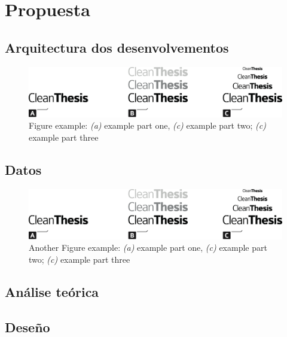 %
\chapter{Propuesta}
\label{sec:system}



{
\color{gray}
\Blindtext[2][1]
}

\section{Arquitectura dos desenvolvementos}
\label{sec:system:sec1}
{
\color{gray}
\Blindtext[1][2]
}

\begin{figure}[htb]
	\includegraphics[width=\textwidth]{images/Clean-Thesis-Figure}
	\caption{Figure example: \textit{(a)} example part one, \textit{(c)} example part two; \textit{(c)} example part three}
	\label{fig:system:example1}
\end{figure}

{
\color{gray}
\Blindtext[1][2]
}

\section{Datos}
\label{sec:system:sec2}

{
\color{gray}
\Blindtext[1][2]
}

\begin{figure}[htb]
	\includegraphics[width=\textwidth]{images/Clean-Thesis-Figure}
	\caption{Another Figure example: \textit{(a)} example part one, \textit{(c)} example part two; \textit{(c)} example part three}
	\label{fig:system:example2}
\end{figure}

{
\color{gray}
\Blindtext[2][2]
}

\section{Análise teórica}
\label{sec:system:sec3}
{
\color{gray}
\Blindtext[4][2]
}

\section{Deseño}
\label{sec:system:design}
{
\color{gray}
\Blindtext[2][1]
}